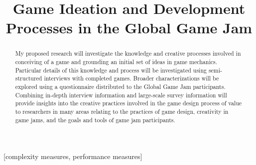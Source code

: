 \documentclass{sig-alternate}
\begin{document}

\title{Game Ideation and Development Processes in the Global Game Jam}


\maketitle
\begin{abstract}
My proposed research will investigate the knowledge and creative processes involved in conceiving of a game and grounding an initial set of ideas in game mechanics. Particular details of this knowledge and process will be investigated using semi-structured interviews with completed games. Broader characterizations will be explored using a questionnaire distributed to the Global Game Jam participants. Combining in-depth interview information and large-scale survey information will provide insights into the creative practices involved in the game design process of value to researchers in many areas relating to the practices of game design, creativity in game jams, and the goals and tools of game jam participants.
\end{abstract}

[complexity measures, performance measures]
\end{document}
